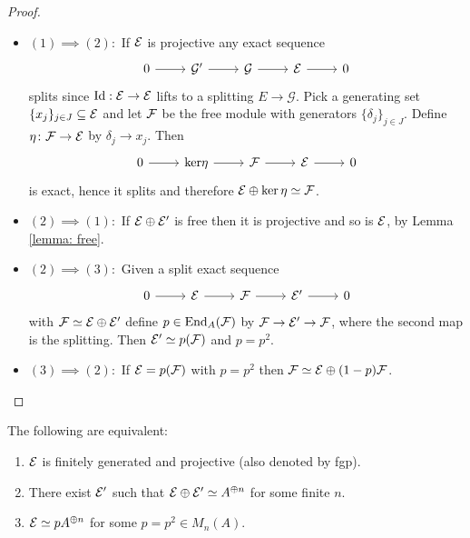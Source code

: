\begin{proof}\noindent 
 \begin{itemize}
 \item $(1)\implies(2):$ If $\mathcal{E}$ is projective any exact sequence $$\begin{tikzcd}0\arrow[r] & \mathcal G'\arrow[r] & \mathcal G \arrow[r] & \E\arrow[r] & 0 \end{tikzcd}$$ splits since $\mathrm{Id}:\mathcal{E}\to\mathcal{E}$ lifts to a splitting $E\to\mathcal G$. Pick a generating set $\{x_j\}_{j\in J}\subseteq\mathcal{E}$ and let $\mathcal{F}$ be the free module with generators $\{\delta_j\}_{j\in J}$. Define $\eta\colon\mathcal{F}\to\mathcal{E}$ by $\delta_j\to x_j$. Then $$\begin{tikzcd}0\arrow[r] & \mathcal \ker\eta\arrow[r] & \mathcal \F \arrow[r] & \E\arrow[r] & 0 \end{tikzcd}$$ is exact, hence it splits and therefore $\mathcal{E}\oplus\ker\eta\simeq\mathcal{F}$.
 \item $(2)\implies(1):$ If $\mathcal{E}\oplus\mathcal{E}'$ is free then it is projective and so is $\mathcal{E}$, by Lemma \eqref{lemma: free}.
 \item $(2)\implies(3):$ Given a split exact sequence $$\begin{tikzcd}0\arrow[r] & \mathcal \E\arrow[r] & \mathcal \F \arrow[r] & \E'\arrow[r] & 0 \end{tikzcd}$$ with $\mathcal{F}\simeq\mathcal{E}\oplus\mathcal{E}'$ define $p\in\mathrm{End}_A(\mathcal{F})$ by $\mathcal{F}\to\mathcal{E}'\to\mathcal{F}$, where the second map is the splitting. Then $\mathcal{E}'\simeq p(\mathcal{F})$ and $p=p^2$.
 \item $(3)\implies(2):$ If $\mathcal{E}=p(\mathcal{F})$ with $p=p^2$ then $\mathcal{F}\simeq\mathcal{E}\oplus(1-p)\mathcal{F}$.
 \end{itemize}
\end{proof}

\begin{corollary}\label{corollary: fgp}
 The following are equivalent:
 \begin{enumerate}
  \item $\mathcal{E}$ is finitely generated and projective (also denoted by fgp).
  \item There exist $\mathcal{E}'$ such that $\mathcal{E}\oplus\mathcal{E}'\simeq A^{\oplus n}$ for some finite $n$.
  \item $\mathcal{E}\simeq pA^{\oplus n}$ for some $p=p^2\in M_n(A)$.
 \end{enumerate}
\end{corollary}

